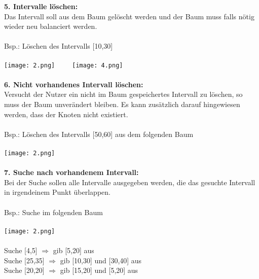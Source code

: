 \documentclass[a4paper,12pt]{scrartcl}
\begin{document}
\textbf{5. Intervalle löschen:}\\
Das Intervall soll aus dem Baum gelöscht werden und der Baum muss falls nötig wieder neu balanciert werden.\\\\
Bsp.: Löschen des Intervalls [10,30]\\\\
\texttt{[image: 2.png]}$~~~~~~~~~~~$\texttt{[image: 4.png]}\\\\
\textbf{6. Nicht vorhandenes Intervall löschen:}\\
Versucht der Nutzer ein nicht im Baum gespeichertes Intervall zu löschen, so muss der Baum unverändert bleiben. Es kann zusätzlich darauf hingewiesen werden, dass der Knoten nicht existiert.\\\\
Bsp.: Löschen des Intervalls [50,60] aus dem folgenden Baum\\\\
\texttt{[image: 2.png]}\\\\
\textbf{7. Suche nach vorhandenem Intervall:}\\
Bei der Suche sollen alle Intervalle ausgegeben werden, die das gesuchte Intervall in irgendeinem Punkt überlappen.\\\\
Bsp.: Suche im folgenden Baum\\\\
\texttt{[image: 2.png]}\\\\Suche [4,5] $\Rightarrow$ gib [5,20] aus\\
Suche [25,35] $\Rightarrow$ gib [10,30] und [30,40] aus\\
Suche [20,20] $\Rightarrow$ gib [15,20] und [5,20] aus
\end{document}
